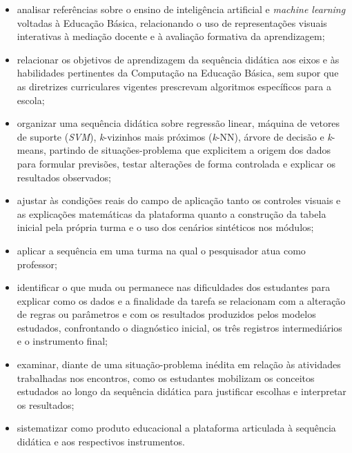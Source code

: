 \begin{itemize}
    \item analisar referências sobre o ensino de inteligência artificial e \textit{machine learning} voltadas à Educação Básica, relacionando o uso de representações visuais interativas à mediação docente e à avaliação formativa da aprendizagem;
    \item relacionar os objetivos de aprendizagem da sequência didática aos eixos e às habilidades pertinentes da Computação na Educação Básica, sem supor que as diretrizes curriculares vigentes prescrevam algoritmos específicos para a escola;
    \item organizar uma sequência didática sobre regressão linear, máquina de vetores de suporte (\textit{SVM}), \textit{k}-vizinhos mais próximos (\textit{k}-NN), árvore de decisão e \textit{k}-means, partindo de situações-problema que explicitem a origem dos dados para formular previsões, testar alterações de forma controlada e explicar os resultados observados;
    \item ajustar às condições reais do campo de aplicação tanto os controles visuais e as explicações matemáticas da plataforma quanto a construção da tabela inicial pela própria turma e o uso dos cenários sintéticos nos módulos;
    \item aplicar a sequência em uma turma na qual o pesquisador atua como professor;
    \item identificar o que muda ou permanece nas dificuldades dos estudantes para explicar como os dados e a finalidade da tarefa se relacionam com a alteração de regras ou parâmetros e com os resultados produzidos pelos modelos estudados, confrontando o diagnóstico inicial, os três registros intermediários e o instrumento final;
    \item examinar, diante de uma situação-problema inédita em relação às atividades trabalhadas nos encontros, como os estudantes mobilizam os conceitos estudados ao longo da sequência didática para justificar escolhas e interpretar os resultados;
    \item sistematizar como produto educacional a plataforma articulada à sequência didática e aos respectivos instrumentos.
\end{itemize}
